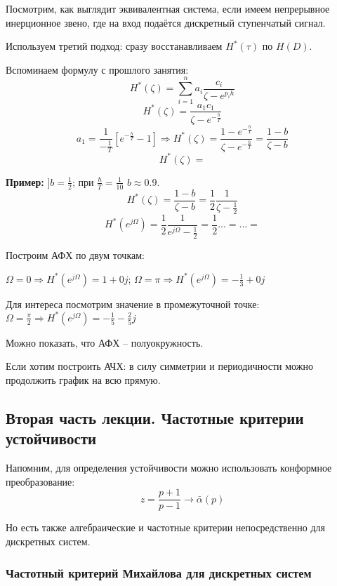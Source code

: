 \documentclass[main.tex]{subfiles}
\begin{document}
Посмотрим, как выглядит эквивалентная система, если имеем непрерывное инерционное звено, где на вход подаётся дискретный ступенчатый сигнал.


Используем третий подход: сразу восстанавливаем $ H^*(\tau) $ по $ H(D) $.

Вспоминаем формулу с прошлого занятия:
\[ H^*(\zeta) = \sum_{i=1}^n a_i \frac{c_i}{\zeta -e^{p_i h}} \] 
\[ H^*(\zeta) = \frac{a_1 c_1}{\zeta - e^{- \frac{h}{T}}} \]
\[ a_1 = \frac{1}{-\frac{1}{T}} [ e^{-\frac{h}{T}} - 1 ] \Rightarrow H^*(\zeta) = \frac{1 - e^{- \frac{h}{T}}}{\zeta - e^{- \frac{h}{T}}} = \frac{1 - b}{\zeta - b} \]
\[ H^*(\zeta) =  \] %

\textbf{ Пример: }
$ ] b = \frac{1}{2} $; при $ \frac{h}{T} = \frac{1}{10}$ $ b \approx 0.9 $.
\[ H^*(\zeta) = \frac{1 - b}{\zeta - b} = \frac{1}{2} \frac{1}{\zeta - \frac{1}{2}} \]
\[ H^*(e^{j \Omega}) = \frac{1}{2} \frac{1}{e^{j \Omega} - \frac{1}{2}} = \frac{1}{2} ... = ... =  \] %

Построим АФХ по двум точкам:

$ \Omega = 0 \Rightarrow H^*(e^{j \Omega}) = 1 + 0j  $; $ \Omega = \pi \Rightarrow H^*(e^{j \Omega}) = - \frac{1}{3} + 0j $

Для интереса посмотрим значение в промежуточной точке: $ \Omega = \frac{\pi}{2} \Rightarrow H^*(e^{j \Omega}) = -\frac{1}{5} - \frac{2}{5}j $


Можно показать, что АФХ -- полуокружность.

Если хотим построить АЧХ:
в силу симметрии и периодичности можно продолжить график на всю прямую.


\subsection{ Вторая часть лекции. Частотные критерии устойчивости }

Напомним, для определения устойчивости можно использовать конформное преобразование:
\[ z = \frac{ p+1 }{ p-1 } \to \bar \alpha(p) \]

Но есть также алгебраические и частотные критерии непосредственно для дискретных систем.

\subsubsection{ Частотный критерий Михайлова для дискретных систем }
\end{document}
